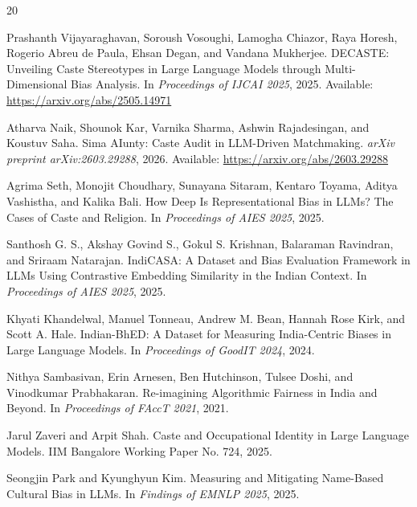 \documentclass[sigplan,screen]{acmart}
\begin{document}
\begin{thebibliography}{20}


Prashanth Vijayaraghavan, Soroush Vosoughi, Lamogha Chiazor, Raya Horesh, Rogerio Abreu de Paula, Ehsan Degan, and Vandana Mukherjee.
\newblock DECASTE: Unveiling Caste Stereotypes in Large Language Models through Multi-Dimensional Bias Analysis.
\newblock In \emph{Proceedings of IJCAI 2025}, 2025.
\newblock Available: \url{https://arxiv.org/abs/2505.14971}

Atharva Naik, Shounok Kar, Varnika Sharma, Ashwin Rajadesingan, and Koustuv Saha.
\newblock Sima AIunty: Caste Audit in LLM-Driven Matchmaking.
\newblock \emph{arXiv preprint arXiv:2603.29288}, 2026.
\newblock Available: \url{https://arxiv.org/abs/2603.29288}

Agrima Seth, Monojit Choudhary, Sunayana Sitaram, Kentaro Toyama, Aditya Vashistha, and Kalika Bali.
\newblock How Deep Is Representational Bias in LLMs? The Cases of Caste and Religion.
\newblock In \emph{Proceedings of AIES 2025}, 2025.

Santhosh G. S., Akshay Govind S., Gokul S. Krishnan, Balaraman Ravindran, and Sriraam Natarajan.
\newblock IndiCASA: A Dataset and Bias Evaluation Framework in LLMs Using Contrastive Embedding Similarity in the Indian Context.
\newblock In \emph{Proceedings of AIES 2025}, 2025.

Khyati Khandelwal, Manuel Tonneau, Andrew M. Bean, Hannah Rose Kirk, and Scott A. Hale.
\newblock Indian-BhED: A Dataset for Measuring India-Centric Biases in Large Language Models.
\newblock In \emph{Proceedings of GoodIT 2024}, 2024.

Nithya Sambasivan, Erin Arnesen, Ben Hutchinson, Tulsee Doshi, and Vinodkumar Prabhakaran.
\newblock Re-imagining Algorithmic Fairness in India and Beyond.
\newblock In \emph{Proceedings of FAccT 2021}, 2021.

Jarul Zaveri and Arpit Shah.
\newblock Caste and Occupational Identity in Large Language Models.
\newblock IIM Bangalore Working Paper No. 724, 2025.


Seongjin Park and Kyunghyun Kim.
\newblock Measuring and Mitigating Name-Based Cultural Bias in LLMs.
\newblock In \emph{Findings of EMNLP 2025}, 2025.


\end{thebibliography}
\end{document}
